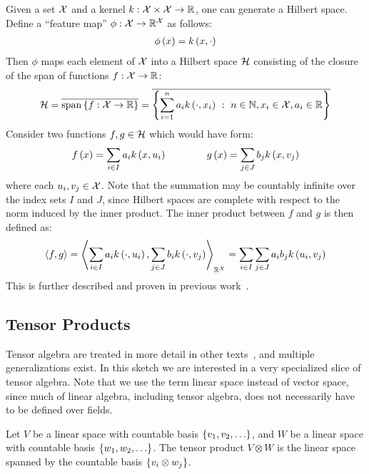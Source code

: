\documentclass[12pt]{article}
\begin{document}
Given a set \(\mathcal{X}\) and a kernel
\(k : \mathcal{X} \times \mathcal{X} \to \mathbb{R}\),
one can generate a Hilbert space.
Define a ``feature map'' \(\phi : \mathcal{X} \to \mathbb{R}^{\mathcal{X}}\)
as follows:
\begin{align}
  \phi\left(x\right) = k\left(x, \cdot\right)
\end{align}
Then \(\phi\) maps each element of \(\mathcal{X}\)
into a Hilbert space \(\mathcal{H}\) consisting of the closure of
the span of functions \(f : \mathcal{X} \to \mathbb{R}\):
\begin{align}
  \mathcal{H} =
    \overline{\mathrm{span}\left\{f : \mathcal{X} \to \mathbb{R}\right\}}
    = \overline{
        \left\{
          \sum_{i = 1}^{n} a_i k\left(\cdot, x_i\right)
            \  : \  n \in \mathbb{N}, x_i \in \mathcal{X}, a_i \in \mathbb{R}\right\}}
\end{align}
Consider two functions \(f, g \in \mathcal{H}\) which would have form:
\begin{align}
  f\left(x\right) = \sum_{i \in I} a_i k\left(x, u_i\right)
  \qquad \qquad
  g\left(x\right) = \sum_{j \in J} b_j k\left(x, v_j\right)
\end{align}
where each \(u_i, v_j \in \mathcal{X}\).
Note that the summation may be countably infinite over the index sets \(I\)
and \(J\), since Hilbert spaces are complete with
respect to the norm induced by the inner product.
The inner product between \(f\) and \(g\) is then defined as:
\begin{align}
  \left\langle f, g\right\rangle
    = \left\langle\sum_{i \in I} a_i k\left(\cdot, u_i\right),
              \sum_{j \in J} b_i k\left(\cdot, v_j\right)\right\rangle_{\mathbb{R}^{\mathcal{X}}}
    = \sum_{i \in I} \sum_{j \in J} a_i b_j k\left(u_i, v_j\right)
\end{align}
This is further described and proven in previous
work~\cite{cortes2004rational, vishwanathan2010graph}.



\subsection{Tensor Products}
Tensor algebra are treated in more detail
in other texts~\cite{itskov2007tensor},
and multiple generalizations exist.
In this sketch we are interested in a very specialized slice of
tensor algebra.
Note that we use the term linear space instead of vector space,
since much of linear algebra, including tensor algebra,
does not necessarily have to be defined over fields.

\begin{definition}
  Let \(V\) be a linear space with countable basis
  \(\left\{v_1, v_2, \ldots\right\}\),
  and \(W\) be a linear space with countable basis
  \(\left\{w_1, w_2, \ldots\right\}\).
  The tensor product \(V \otimes W\) is the linear space
  spanned by the countable basis \(\left\{v_i \otimes w_j\right\}\).
\end{definition}
\end{document}
